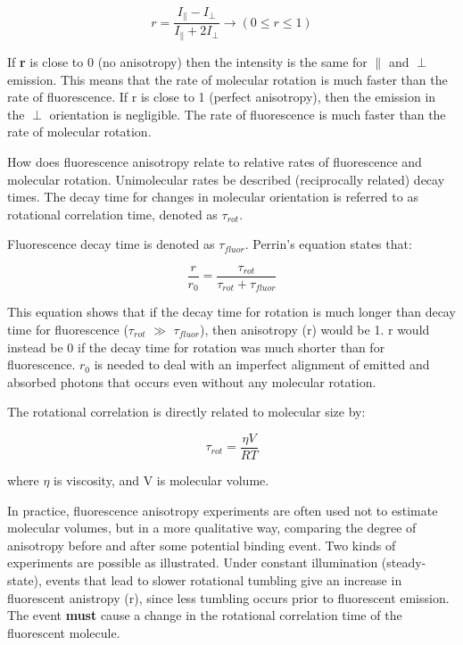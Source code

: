 \documentclass[12pt, letterpaper]{article}
\begin{document}
\begin{equation*}
    r = \frac{I_{\parallel} - I_{\perp}}{I_{\parallel} + 2I_{\perp}}  \longrightarrow (0 \leq r \leq  1)
\end{equation*}

If \textbf{r} is close to 0 (no anisotropy) then the intensity is the same for $\parallel$ and $\perp$ emission. This means that the rate of molecular rotation is much faster than the rate of fluorescence. 
If r is close to 1 (perfect anisotropy), then the emission in the $\perp$ orientation is negligible. The rate of fluorescence is much faster than the rate of molecular rotation. 

\newpage

How does fluorescence anisotropy relate to relative rates of fluorescence and molecular rotation. Unimolecular rates be described (reciprocally related) decay times. The decay time for changes
in molecular orientation is referred to as rotational correlation time, denoted as $\tau_{rot}$. 

Fluorescence decay time is denoted as $\tau_{fluor}$. Perrin's equation states that:

\begin{equation*}
    \frac{r}{r_0} = \frac{\tau_{rot}}{\tau_{rot} + \tau_{fluor}}
\end{equation*}

This equation shows that if the decay time for rotation is much longer than decay time for fluorescence ($\tau_{rot}$ $\gg$ $\tau_{fluor}$), then anisotropy (r) would be 1.
r would instead be 0 if the decay time for rotation was much shorter than for fluorescence. $r_0$ is needed to deal with an imperfect alignment of emitted and absorbed photons that occurs even without any molecular 
rotation.  

The rotational correlation is directly related to molecular size by: 

\begin{equation*}
    \tau_{rot} = \frac{\eta V}{RT}
\end{equation*}

where $\eta$ is viscosity, and V is molecular volume. 

In practice, fluorescence anisotropy experiments are often used not to estimate molecular volumes, but in a more qualitative way, comparing the degree of anisotropy before and after some potential binding event. 
Two kinds of experiments are possible as illustrated. Under constant illumination (steady-state), events that lead to slower rotational tumbling give an increase in fluorescent anistropy (r), since less tumbling
occurs prior to fluorescent emission. The event \textbf{must} cause a change in the rotational correlation time of the fluorescent molecule. 
\end{document}
